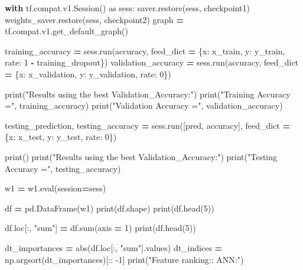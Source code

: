 \documentclass[]{book}
\newenvironment{Shaded}{\begin{snugshade}}{\end{snugshade}}
\newcommand{\DecValTok}[1]{\textcolor[rgb]{0.00,0.00,0.81}{#1}}
\newcommand{\StringTok}[1]{\textcolor[rgb]{0.31,0.60,0.02}{#1}}
\newcommand{\ImportTok}[1]{#1}
\newcommand{\ControlFlowTok}[1]{\textcolor[rgb]{0.13,0.29,0.53}{\textbf{#1}}}
\newcommand{\OperatorTok}[1]{\textcolor[rgb]{0.81,0.36,0.00}{\textbf{#1}}}
\newcommand{\BuiltInTok}[1]{#1}
\newcommand{\NormalTok}[1]{#1}
\begin{document}
\begin{Shaded}
\begin{Highlighting}[]
\ControlFlowTok{with}\NormalTok{ tf.compat.v1.Session() }\ImportTok{as}\NormalTok{ sess:}
\NormalTok{    saver.restore(sess, checkpoint1)}
\NormalTok{    weights_saver.restore(sess, checkpoint2)}
\NormalTok{    graph }\OperatorTok{=}\NormalTok{ tf.compat.v1.get_default_graph()}
    
\NormalTok{    training_accuracy }\OperatorTok{=}\NormalTok{ sess.run(accuracy, feed_dict }\OperatorTok{=}\NormalTok{ \{x: x_train, y: y_train, rate: }\DecValTok{1} \OperatorTok{-}\NormalTok{ training_dropout\})}
\NormalTok{    validation_accuracy }\OperatorTok{=}\NormalTok{ sess.run(accuracy, feed_dict }\OperatorTok{=}\NormalTok{ \{x: x_validation, y: y_validation, rate: }\DecValTok{0}\NormalTok{\})}
    
    \BuiltInTok{print}\NormalTok{(}\StringTok{"Results using the best Validation_Accuracy:"}\NormalTok{)}
    \BuiltInTok{print}\NormalTok{(}\StringTok{"Training Accuracy ="}\NormalTok{, training_accuracy)}
    \BuiltInTok{print}\NormalTok{(}\StringTok{"Validation Accuracy ="}\NormalTok{, validation_accuracy)}

\NormalTok{    testing_prediction, testing_accuracy }\OperatorTok{=}\NormalTok{ sess.run([pred, accuracy], feed_dict }\OperatorTok{=}\NormalTok{ \{x: x_test, y: y_test, rate: }\DecValTok{0}\NormalTok{\})}
    
    \BuiltInTok{print}\NormalTok{()}
    \BuiltInTok{print}\NormalTok{(}\StringTok{"Results using the best Validation_Accuracy:"}\NormalTok{)}
    \BuiltInTok{print}\NormalTok{(}\StringTok{"Testing Accuracy ="}\NormalTok{, testing_accuracy)}

\NormalTok{    w1 }\OperatorTok{=}\NormalTok{ w1.}\BuiltInTok{eval}\NormalTok{(session}\OperatorTok{=}\NormalTok{sess)}
 
\NormalTok{    df }\OperatorTok{=}\NormalTok{ pd.DataFrame(w1)}
    \BuiltInTok{print}\NormalTok{(df.shape)}
    \BuiltInTok{print}\NormalTok{(df.head(}\DecValTok{5}\NormalTok{))}

\NormalTok{    df.loc[:, }\StringTok{"sum"}\NormalTok{] }\OperatorTok{=}\NormalTok{ df.}\BuiltInTok{sum}\NormalTok{(axis }\OperatorTok{=} \DecValTok{1}\NormalTok{)}
    \BuiltInTok{print}\NormalTok{(df.head(}\DecValTok{5}\NormalTok{))}
    

\NormalTok{    dt_importances }\OperatorTok{=} \BuiltInTok{abs}\NormalTok{(df.loc[:, }\StringTok{"sum"}\NormalTok{].values)}
\NormalTok{    dt_indices }\OperatorTok{=}\NormalTok{ np.argsort(dt_importances)[:: }\DecValTok{-1}\NormalTok{]}
    \BuiltInTok{print}\NormalTok{(}\StringTok{"Feature ranking:: ANN:"}\NormalTok{)}


\end{Highlighting}
\end{Shaded}
\end{document}
